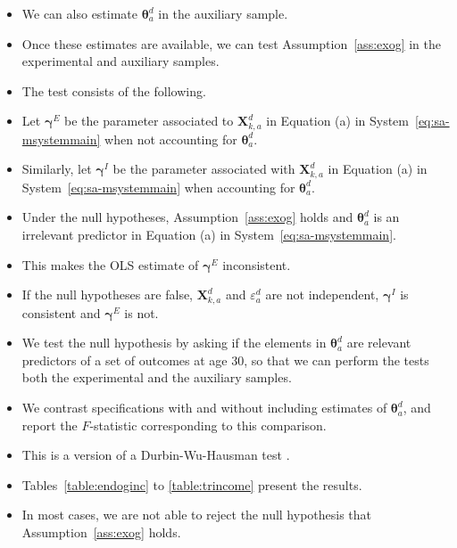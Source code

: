\documentclass[static]{JJH-Beamer}
\begin{document}
\begin{frame}

\begin{itemize}
\item We can also estimate $\bm{\theta}_{a}^d$ in the auxiliary sample.
\item Once these estimates are available, we can test Assumption~\ref{ass:exog} in the experimental and auxiliary samples.
\item The test consists of the following.
\item Let $\bm{\gamma}^E$ be the parameter associated to $\bm{X}^d_{k,a}$ in Equation (a) in System~\eqref{eq:sa-msystemmain} when not accounting for $\bm{\theta}_{a}^d$.
\item Similarly, let $\bm{\gamma}^I$ be the parameter associated with $\bm{X}^d_{k,a}$ in Equation (a) in System~\eqref{eq:sa-msystemmain} when accounting for $\bm{\theta}_{a}^d$.
\item Under the null hypotheses, Assumption~\ref{ass:exog} holds and $\bm{\theta}_{a}^d$ is an irrelevant predictor in Equation (a) in System~\eqref{eq:sa-msystemmain}.
\item This makes the OLS estimate of $\bm{\gamma}^E$ inconsistent.
\end{itemize}

\end{frame}

\begin{frame}

\begin{itemize}
\item If the null hypotheses are false, $\bm{X}^d_{k,a}$ and $\varepsilon_{a}^d$ are not independent, $\bm{\gamma}^I$ is consistent and $\bm{\gamma}^E$ is not.
\item We test the null hypothesis by asking if the elements in $\bm{\theta}_{a}^d$ are relevant predictors of a set of outcomes at age 30, so that we can perform the tests both the experimental and the auxiliary samples.
\item We contrast specifications with and without including estimates of $\bm{\theta}_{a}^d$, and report the $F$-statistic corresponding to this comparison.
\item This is a version of a Durbin-Wu-Hausman test \citep[see][]{Durbin_1954_RISI,Wu_1973_Econometrica,Hausman_1978_Econometrica}.
\item Tables~\ref{table:endoginc} to \ref{table:trincome} present the results.
\item In most cases, we are not able to reject the null hypothesis that Assumption~\ref{ass:exog} holds.
\end{itemize}

\end{frame}
\end{document}
